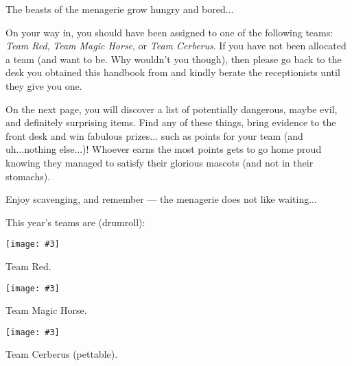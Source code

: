 \newcommand{\team}[3]{
  \hfill
  \begin{minipage}[t]{0.3\textwidth}
    \begin{center}
      \texttt{[image: \#3]}
      \par\vspace{-0.5\baselineskip}
                 {\Large \altfont{#1}}
                 \par\vspace{-0.5\baselineskip}
                 #2
    \end{center}
  \end{minipage}
  \hfill
}

The beasts of the menagerie grow hungry and bored... 

On your way in, you should have been assigned to one of the following teams: \emph{Team Red}, \emph{Team Magic Horse}, or \emph{Team Cerberus}. If you have not been allocated a team (and want to be. Why wouldn't you though), then please go back to the desk you obtained this handbook from and kindly berate the receptionists until they give you one.

On the next page, you will discover a list of potentially dangerous, maybe evil, and definitely surprising items. Find any of these things, bring evidence to the front desk and win fabulous prizes... such as points for your team (and uh...nothing else...)! Whoever earns the most points gets to go home proud knowing they managed to satisfy their glorious mascots (and not in their stomachs).

Enjoy scavenging, and remember --- the menagerie does not like waiting...

\vspace{1.8\baselineskip}

\begin{center} This year's teams are (drumroll): \end{center}

\vspace{\baselineskip}

\hfill
\team{Blue}{
  Team Red.
}{img/quest/Blue.jpg}
\team{Raspberry}{
  Team Magic Horse.
  }{img/quest/Raspberry.jpg}
\team{Johnny}{
  Team Cerberus (pettable).
  }{img/quest/Johnny.jpg}
\hfill

\vspace{1.8\baselineskip}

